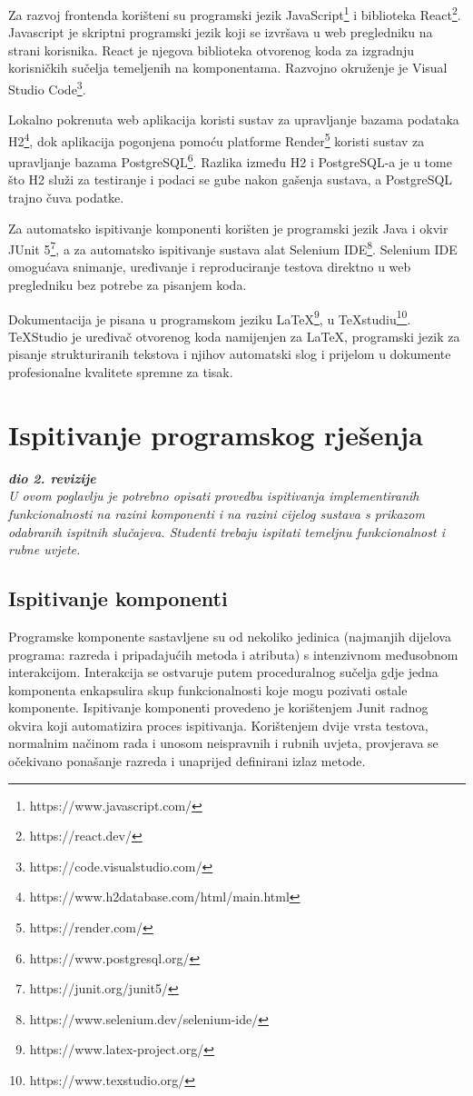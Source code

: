 			Za razvoj frontenda korišteni su programski jezik JavaScript\footnote{https://www.javascript.com/} i biblioteka React\footnote{https://react.dev/}. Javascript je skriptni programski jezik koji se izvršava u web pregledniku na strani korisnika. React je njegova biblioteka otvorenog koda za izgradnju korisničkih sučelja temeljenih na komponentama. Razvojno okruženje je Visual Studio Code\footnote{https://code.visualstudio.com/}. 
			
			Lokalno pokrenuta web aplikacija koristi sustav za upravljanje bazama podataka H2\footnote{https://www.h2database.com/html/main.html}, dok aplikacija pogonjena pomoću platforme Render\footnote{https://render.com/} koristi sustav za upravljanje bazama PostgreSQL\footnote{https://www.postgresql.org/}. Razlika između H2 i PostgreSQL-a je u tome što H2 služi za testiranje i podaci se gube nakon gašenja sustava, a PostgreSQL trajno čuva podatke. 
			
			Za automatsko ispitivanje komponenti korišten je programski jezik Java i okvir JUnit 5\footnote{https://junit.org/junit5/}, a za automatsko ispitivanje sustava alat Selenium IDE\footnote{https://www.selenium.dev/selenium-ide/}. Selenium IDE omogućava snimanje, uređivanje i reproduciranje testova direktno u web pregledniku bez potrebe za pisanjem koda.
			
			Dokumentacija je pisana u programskom jeziku LaTeX\footnote{https://www.latex-project.org/}, u TeXstudiu\footnote{https://www.texstudio.org/}. TeXStudio je uređivač otvorenog koda namijenjen za LaTeX, programski jezik za pisanje strukturiranih tekstova i njihov automatski slog i prijelom u dokumente profesionalne kvalitete spremne za tisak.
						 
			
			\eject 
		
	
		\section{Ispitivanje programskog rješenja}
			
			\textbf{\textit{dio 2. revizije}}\\
			
			 \textit{U ovom poglavlju je potrebno opisati provedbu ispitivanja implementiranih funkcionalnosti na razini komponenti i na razini cijelog sustava s prikazom odabranih ispitnih slučajeva. Studenti trebaju ispitati temeljnu funkcionalnost i rubne uvjete.}
	
			
			\subsection{Ispitivanje komponenti}
			Programske komponente sastavljene su od nekoliko jedinica (najmanjih dijelova programa: razreda i pripadajućih metoda i atributa) s intenzivnom međusobnom interakcijom. Interakcija se ostvaruje putem proceduralnog sučelja gdje jedna komponenta enkapsulira skup funkcionalnosti koje mogu pozivati ostale komponente. Ispitivanje komponenti provedeno je  korištenjem Junit radnog okvira koji automatizira proces ispitivanja. Korištenjem dvije vrsta testova, normalnim načinom rada i unosom neispravnih i rubnih uvjeta, provjerava se očekivano ponašanje razreda i unaprijed definirani izlaz metode.
			
